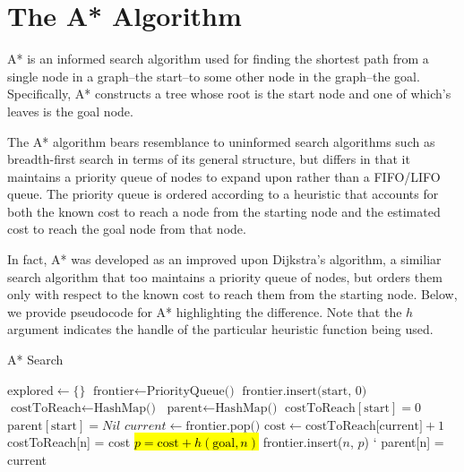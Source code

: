 \documentclass[12pt, conference, compsocconf]{IEEEtran}
\begin{document}
\section{The A* Algorithm}
A* is an informed search algorithm used for finding the shortest path from a
single node in a graph--the start--to some other node in the graph--the goal.
Specifically, A* constructs a tree whose root is the start node and one of
which's leaves is the goal node.

The A* algorithm bears resemblance to uninformed search algorithms such as
breadth-first search in terms of its general structure, but differs in that it
maintains a priority queue of nodes to expand upon rather than a FIFO/LIFO
queue.  The priority queue is ordered according to a heuristic that accounts
for both the known cost to reach a node from the starting node and the
estimated cost to reach the goal node from that node.

In fact, A* was developed as an improved upon Dijkstra's algorithm, a similiar
search algorithm that too maintains a priority queue of nodes, but orders them
only with respect to the known cost to reach them from the starting node.
Below, we provide pseudocode for A* highlighting the difference.  Note that the
$h$ argument indicates the handle of the particular heuristic function being
used.

\begin{algorithm}
    \caption{A* Search}
    \label{alg-astar}
    \begin{algorithmic}[1]
            \State $\text{explored} \gets \{\}$
            \State $\text{frontier} \gets \text{PriorityQueue()}$
            \State $\text{frontier.insert(start, 0)}$
            \State $\text{costToReach} \gets \text{HashMap()}$
            \State $\text{parent} \gets \text{HashMap()}$
            \State $\text{costToReach}[\text{start}] = 0$
            \State $\text{parent}[\text{start}] = Nil$
                \State $current \gets \text{frontier.pop()}$
                \Else
                        \State $\text{cost} \gets \text{costToReach[current]} + 1$
                                \State costToReach[n] = cost
                                \State \hl{$p = \text{cost} + h(\text{goal}, n)$}
                                \State frontier.insert($n$, $p$)
            `                   \State parent[n] = current
                            \EndIf
                        \EndFor
                \EndIf
            \EndWhile
        \State {}
        \EndFunction
    \end{algorithmic}
\end{algorithm}
\end{document}
